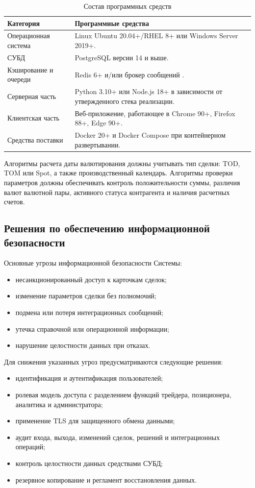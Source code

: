 \documentclass[a4paper,14pt]{extarticle}
\providecommand{\textslash}{/\penalty\hyphenpenalty\relax}
\let\oldtexttt\texttt
\renewcommand{\texttt}[1]{\oldtexttt{\seqsplit{#1}}}
\begin{document}
\begin{table}[H]
\centering
\small
\caption{Состав программных средств}
\label{tab:software}
\begin{tabularx}{\linewidth}{|L{45mm}|X|}
\hline
\textbf{Категория} & \textbf{Программные средства} \\
\hline
Операционная система & Linux Ubuntu 20.04+/RHEL 8+ или Windows Server 2019+. \\
\hline
СУБД & PostgreSQL версии 14 и выше. \\
\hline
Кэширование и очереди & Redis 6+ и/или брокер сообщений \texttt{RabbitMQ\textslash Kafka}. \\
\hline
Серверная часть & Python 3.10+ или Node.js 18+ в зависимости от утвержденного стека реализации. \\
\hline
Клиентская часть & Веб-приложение, работающее в Chrome 90+, Firefox 88+, Edge 90+. \\
\hline
Средства поставки & Docker 20+ и Docker Compose при контейнерном развертывании. \\
\hline
\end{tabularx}
\end{table}

Алгоритмы расчета даты валютирования должны учитывать тип сделки: TOD, TOM или Spot, а также производственный календарь. Алгоритмы проверки параметров должны обеспечивать контроль положительности суммы, различия валют валютной пары, активного статуса контрагента и наличия расчетных счетов.

\subsection{Решения по обеспечению информационной безопасности}
Основные угрозы информационной безопасности Системы:
\begin{itemize}[itemsep=1mm]
  \item несанкционированный доступ к карточкам сделок;
  \item изменение параметров сделки без полномочий;
  \item подмена или потеря интеграционных сообщений;
  \item утечка справочной или операционной информации;
  \item нарушение целостности данных при отказах.
\end{itemize}

Для снижения указанных угроз предусматриваются следующие решения:
\begin{itemize}[itemsep=1mm]
  \item идентификация и аутентификация пользователей;
  \item ролевая модель доступа с разделением функций трейдера, позиционера, аналитика и администратора;
  \item применение TLS для защищенного обмена данными;
  \item аудит входа, выхода, изменений сделок, решений и интеграционных операций;
  \item контроль целостности данных средствами СУБД;
  \item резервное копирование и регламент восстановления данных.
\end{itemize}
\end{document}

